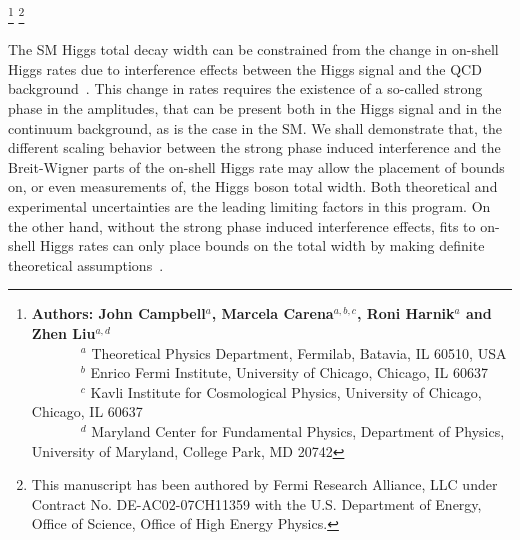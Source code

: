
\footnote{{{\bf Authors: John Campbell$^a$, Marcela Carena$^{a,b,c}$, Roni Harnik$^a$ and Zhen Liu$^{a,d}$}\\
~~~~~~~$^a$ Theoretical Physics Department, Fermilab, Batavia, IL 60510, USA \\ 
~~~~~~~$^b$ Enrico Fermi Institute, University of Chicago, Chicago, IL 60637\\
~~~~~~~$^c$ Kavli Institute for Cosmological Physics, University of Chicago, Chicago, IL 60637\\
~~~~~~~$^d$ Maryland Center for Fundamental Physics, Department of Physics, University of Maryland, College Park, MD 20742
}}
\footnote{This manuscript has been authored by Fermi Research Alliance, LLC under Contract No. DE-AC02-07CH11359 with the U.S. Department of Energy, Office of Science, Office of High Energy Physics.}



The SM Higgs total decay width can be constrained from the change in on-shell Higgs rates due to interference effects between the Higgs signal and the QCD background~\cite{Campbell:2017rke}. This change in rates requires the existence of a so-called strong phase in the amplitudes, that can be present both  in the Higgs signal and in the continuum background, as is the case in the SM. We shall demonstrate that,
the different scaling behavior between   the strong phase induced interference  and the Breit-Wigner parts of the on-shell Higgs rate may allow the placement of bounds on, or even measurements of, the Higgs boson total width.
Both theoretical and experimental uncertainties are the leading  limiting factors in this program. On the other hand, without  the strong phase induced interference effects, fits to on-shell Higgs rates can only place bounds on the total width by making definite theoretical assumptions~\cite{Duhrssen:2004cv,LHCHiggsCrossSectionWorkingGroup:2012nn,Dobrescu:2012td}. 

